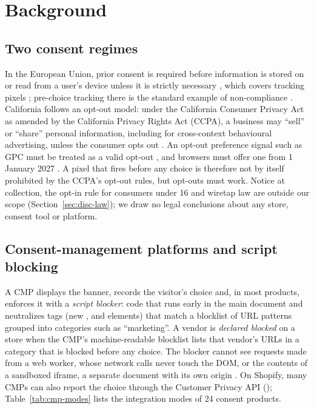 \section{Background}\label{sec:background}

\subsection{Two consent regimes}\label{sec:bg-law}

In the European Union, prior consent is required before information is stored on or read from a user's device unless it is strictly necessary \citep{eprivacy2002,gdpr2016}, which covers tracking pixels \citep{edpb2023guidelines}; pre-choice tracking there is the standard example of non-compliance \citep{papadogiannakis2021post,bouhoula2024automated}. California follows an opt-out model: under the California Consumer Privacy Act as amended by the California Privacy Rights Act (CCPA), a business may ``sell'' or ``share'' personal information, including for cross-context behavioural advertising, unless the consumer opts out \citep{ccpa2018}. An opt-out preference signal such as GPC must be treated as a valid opt-out \citep{ccparegs7025,caag2022sephora}, and browsers must offer one from 1 January 2027 \citep{ab566}. A pixel that fires before any choice is therefore not by itself prohibited by the CCPA's opt-out rules, but opt-outs must work. Notice at collection, the opt-in rule for consumers under 16 and wiretap law are outside our scope (Section~\ref{sec:disc-law}); we draw no legal conclusions about any store, consent tool or platform.

\subsection{Consent-management platforms and script blocking}\label{sec:bg-cmp}

A CMP displays the banner, records the visitor's choice and, in most products, enforces it with a \emph{script blocker}: code that runs early in the main document and neutralizes tags (new ,  and  elements) that match a blocklist of URL patterns grouped into categories such as ``marketing''. A vendor is \emph{declared blocked} on a store when the CMP's machine-readable blocklist lists that vendor's URLs in a category that is blocked before any choice. The blocker cannot see requests made from a web worker, whose network calls never touch the DOM, or the contents of a sandboxed iframe, a separate document with its own origin \citep{whatwg_html}. On Shopify, many CMPs can also report the choice through the Customer Privacy API (); Table~\ref{tab:cmp-modes} lists the integration modes of 24 consent products.

